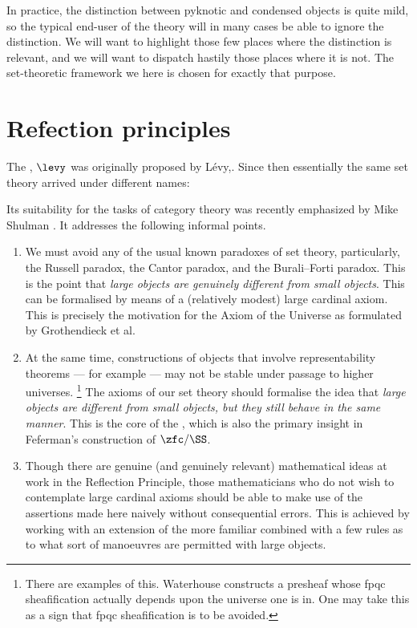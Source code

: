 In practice, the distinction between pyknotic and condensed objects is quite mild,
so the typical end-user of the theory will in many cases be able to ignore the distinction.
We will want to highlight those few places where the distinction is relevant,
and we will want to dispatch hastily those places where it is not.
The set-theoretic framework we  here is chosen for exactly that purpose.

\section{Refection principles}%
\label{sec:reflection_principles}

The , $\levy$ was originally proposed by Lévy,\cite{Levy:1960wx}.
Since then essentially the same set theory arrived under different names:

Its suitability for the tasks of category theory was recently emphasized by Mike Shulman \cite{Shulman:2008th}.
It addresses the following informal points.
\begin{enumerate}
	\item We must avoid any of the usual known paradoxes of set theory,
		particularly, the Russell paradox, the Cantor paradox, and the Burali–Forti paradox.
		This is the point that \emph{large objects are genuinely different from small objects}.
		This can be formalised by means of a (relatively modest) large cardinal axiom.
		This is precisely the motivation for the Axiom of the Universe
		as formulated by Grothendieck et al.\cite[Exposé I, \S 0 and Appendix]{Anonymous:1972tk}
	\item At the same time, constructions of objects that involve representability theorems --- for example --- may not be stable under passage to higher universes.%
		\footnote{There are examples of this.
			Waterhouse constructs a presheaf whose fpqc sheafification actually depends upon the universe one is in.
			One may take this as a sign that fpqc sheafification is to be avoided.}
		The axioms of our set theory should formalise the idea that \emph{large objects are different from small objects, but they still behave in the same manner}.
		This is the core of the , which is also the primary insight in Feferman's construction of $\zfc/\SS$.
	\item Though there are genuine (and genuinely relevant) mathematical ideas at work in the Reflection Principle,
		those mathematicians who do not wish to contemplate large cardinal axioms should be able to make use of the assertions made here naively without consequential errors.
		This is achieved by working with an extension of the more familiar \zfc combined with a few rules as to what sort of manoeuvres are permitted with large objects.
\end{enumerate}

